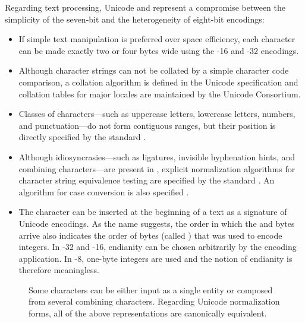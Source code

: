 \documentclass[
  a5paper,10pt,           %
  dvipsnames              %
]{book}
\begin{document}
Regarding text processing, Unicode and  represent a compromise
between the simplicity of the seven-bit  and the heterogeneity of
eight-bit encodings:
\begin{itemize}
  \item If simple text manipulation is preferred over space efficiency, each
    character can be made exactly two or four bytes wide using the
    -16 and -32 encodings.
  \item Although character strings can not be collated by a simple character
    code comparison, a collation algorithm is defined in the Unicode
    specification \cite{unicode15:collation} and collation tables for major
    locales \cite{unicode15:cldr} are maintained by the Unicode Consortium.
  \item Classes of characters---such as uppercase letters, lowercase letters,
    numbers, and punctuation---do not form contiguous ranges, but their position
    is directly specified by the standard \cite[sec.\,4.5]{unicode15}.
  \item Although idiosyncrasies---such as ligatures, invisible hyphenation
    hints, and combining characters---are present in , explicit
    normalization algorithms for character string equivalence testing are
    specified by the standard \cite[sec.\,2.12]{unicode15}. An algorithm
    for case conversion is also specified \cite[sec.\,3.13]{unicode15}.
  \item The  character can be inserted at the
    beginning of a text as a signature of Unicode encodings. As the name
    suggests, the order in which the  and  bytes arrive also
    indicates the order of bytes (called ) that was used to
    encode integers. In -32 and -16, endianity
    can be chosen arbitrarily by the encoding application. In -8,
    one-byte integers are used and the notion of endianity is therefore
    meaningless.
\end{itemize}

\begin{figure}
  
  \caption{Some  characters can be either input as a single
    entity or composed from several combining characters. Regarding Unicode
    normalization forms, all of the above representations are canonically
    equivalent.}
\end{figure}
\end{document}
